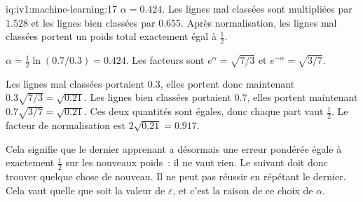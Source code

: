 \begin{solution}{iq:iv1:machine-learning:17}
$\alpha = 0.424$. Les lignes mal classées sont multipliées par $1.528$ et les lignes bien classées par $0.655$. Après normalisation, les lignes mal classées portent un poids total exactement égal à $\frac12$.

$\alpha = \frac12\ln(0.7/0.3) = 0.424$. Les facteurs sont $e^{\alpha} = \sqrt{7/3}$ et $e^{-\alpha} = \sqrt{3/7}$.

Les lignes mal classées portaient $0.3$, elles portent donc maintenant $0.3\sqrt{7/3} = \sqrt{0.21}$. Les lignes bien classées portaient $0.7$, elles portent maintenant $0.7\sqrt{3/7} = \sqrt{0.21}$. Ces deux quantités sont égales, donc chaque part vaut $\frac12$. Le facteur de normalisation est $2\sqrt{0.21} = 0.917$.

Cela signifie que le dernier apprenant a désormais une erreur pondérée égale à exactement $\frac12$ sur les nouveaux poids~: il ne vaut rien. Le suivant doit donc trouver quelque chose de nouveau. Il ne peut pas réussir en répétant le dernier. Cela vaut quelle que soit la valeur de $\varepsilon$, et c'est la raison de ce choix de $\alpha$.



\end{solution}

